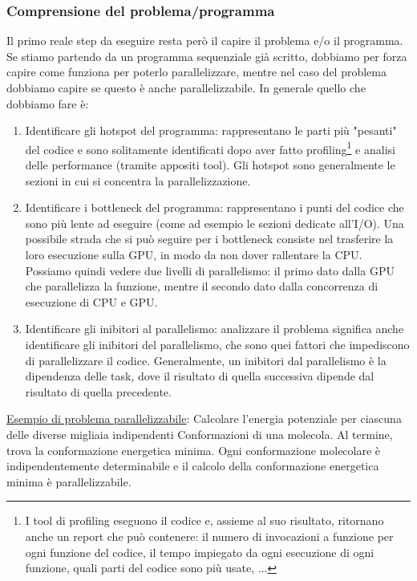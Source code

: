 \subsubsection{Comprensione del problema/programma}
Il primo reale step da eseguire resta però il capire il problema e/o il programma. Se stiamo partendo da un programma sequenziale già scritto, dobbiamo per forza capire come funziona per poterlo parallelizzare, mentre nel caso del problema dobbiamo capire se questo è anche parallelizzabile. 
In generale quello che dobbiamo fare è:
\begin{enumerate}
    \item Identificare gli hotspot del programma: rappresentano le parti più "pesanti" del codice e sono solitamente identificati dopo aver fatto profiling\footnote{I tool di profiling eseguono il codice e, assieme al suo risultato, ritornano anche un report che può contenere: il numero di invocazioni a funzione per ogni funzione del codice, il tempo impiegato da ogni esecuzione di ogni funzione, quali parti del codice sono più usate, ...} e analisi delle performance (tramite appositi tool). Gli hotspot sono generalmente le sezioni in cui si concentra la parallelizzazione.
    \item Identificare i bottleneck del programma: rappresentano i punti del codice che sono più lente ad eseguire (come ad esempio le sezioni dedicate all'I/O). Una possibile strada che si può seguire per i bottleneck consiste nel trasferire la loro esecuzione sulla GPU, in modo da non dover rallentare la CPU. Possiamo quindi vedere due livelli di parallelismo: il primo dato dalla GPU che parallelizza la funzione, mentre il secondo dato dalla concorrenza di esecuzione di CPU e GPU.
    \item Identificare gli inibitori al parallelismo: analizzare il problema significa anche identificare gli inibitori del parallelismo, che sono quei fattori che impediscono di parallelizzare il codice. Generalmente, un inibitori dal parallelismo è la dipendenza delle task, dove il risultato di quella successiva dipende dal risultato di quella precedente.
\end{enumerate}

\underline{Esempio di problema parallelizzabile}: Calcolare l'energia potenziale per ciascuna delle diverse migliaia indipendenti Conformazioni di una molecola. Al termine, trova la conformazione energetica minima. Ogni conformazione molecolare è indipendentemente determinabile e il calcolo della conformazione energetica minima è parallelizzabile.
\\

